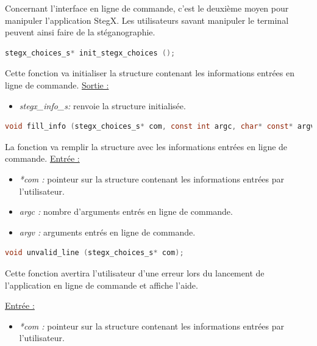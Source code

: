 \documentclass[11pt]{article}
\begin{document}
Concernant l'interface en ligne de commande, c'est le deuxième moyen pour 
manipuler l'application StegX. Les utilisateurs savant manipuler le terminal 
peuvent ainsi faire de la stéganographie. 

\begin{lstlisting}[language=c]
stegx_choices_s* init_stegx_choices ();
\end{lstlisting}

Cette fonction va initialiser la structure contenant les informations 
entrées en ligne de commande. 
\newline
\underline{Sortie :} 
\begin{itemize}
\item \textit{stegx\_info\_s:} renvoie la structure initialisée. 
\newline 
\end{itemize}

\begin{lstlisting}[language=c]
void fill_info (stegx_choices_s* com, const int argc, char* const* argv);
\end{lstlisting}

La fonction va remplir la structure avec les informations entrées en 
ligne de commande. 
\newline
\underline{Entrée :} 
\begin{itemize}
\item \textit{*com :} pointeur sur la structure contenant les informations 
entrées par l'utilisateur. 
\item \textit{argc :} nombre d'arguments entrés en ligne de commande. 
\item \textit{argv :} arguments entrés en ligne de commande. 
\newline 
\end{itemize}

\begin{lstlisting}[language=c]
void unvalid_line (stegx_choices_s* com);
\end{lstlisting}

Cette fonction avertira l'utilisateur d'une erreur lors du lancement 
de l'application en ligne de commande et affiche l'aide. \newline

\underline{Entrée :} 
\begin{itemize}
\item \textit{*com :} pointeur sur la structure contenant les informations 
entrées par l'utilisateur. 
\newline 
\end{itemize}
\end{document}
